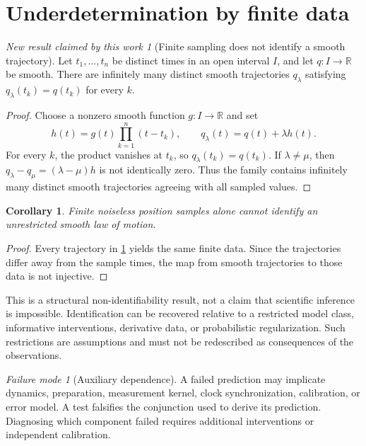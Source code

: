 \documentclass[11pt]{article}
\newtheorem{corollary}[definition]{Corollary}
\theoremstyle{remark}
\newtheorem{newresult}[definition]{New result claimed by this work}
\newtheorem{failuremode}[definition]{Failure mode}
\newcommand{\Real}{\mathbb{R}}
\begin{document}
\section{Underdetermination by finite data}

\begin{newresult}[Finite sampling does not identify a smooth trajectory]\label{res:finite}
Let $t_1,\ldots,t_n$ be distinct times in an open interval $I$, and let $q:I\to\Real$ be smooth.  There are infinitely many distinct smooth trajectories $q_\lambda$ satisfying $q_\lambda(t_k)=q(t_k)$ for every $k$.
\end{newresult}
\begin{proof}
Choose a nonzero smooth function $g:I\to\Real$ and set
\[
 h(t)=g(t)\prod_{k=1}^n(t-t_k),\qquad q_\lambda(t)=q(t)+\lambda h(t).
\]
For every $k$, the product vanishes at $t_k$, so $q_\lambda(t_k)=q(t_k)$.  If $\lambda\neq\mu$, then $q_\lambda-q_\mu=(\lambda-\mu)h$ is not identically zero.  Thus the family contains infinitely many distinct smooth trajectories agreeing with all sampled values.
\end{proof}

\begin{corollary}\label{cor:finite}
Finite noiseless position samples alone cannot identify an unrestricted smooth law of motion.
\end{corollary}
\begin{proof}
Every trajectory in \cref{res:finite} yields the same finite data.  Since the trajectories differ away from the sample times, the map from smooth trajectories to those data is not injective.
\end{proof}

This is a structural non-identifiability result, not a claim that scientific inference is impossible.  Identification can be recovered relative to a restricted model class, informative interventions, derivative data, or probabilistic regularization.  Such restrictions are assumptions and must not be redescribed as consequences of the observations.

\begin{failuremode}[Auxiliary dependence]
A failed prediction may implicate dynamics, preparation, measurement kernel, clock synchronization, calibration, or error model.  A test falsifies the conjunction used to derive its prediction.  Diagnosing which component failed requires additional interventions or independent calibration.
\end{failuremode}
\end{document}
